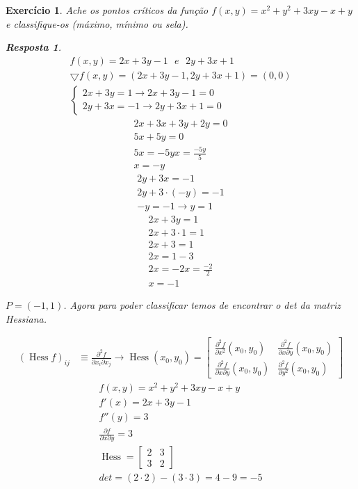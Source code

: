 \documentclass{article}
\newtheorem{ex}{Exercício}
\newtheorem{resp}{Resposta}
\DeclareMathOperator{\Hessian}{Hess}
\begin{document}
\begin{ex}
    Ache os pontos críticos da função $f(x,y) = x^2+y^2+3xy-x+y$ e classifique-os (máximo, mínimo ou sela).
\begin{resp}
\begin{align*}
    f(x,y)=2x+3y-1 \text{ } e \text{ } 2y+3x+1\\
    \bigtriangledown f(x,y)=(2x+3y-1,2y+3x+1)=(0,0)
    \\
    \begin{cases}
    2x+3y=1\to 2x+3y-1=0 \\2y+3x=-1\to 2y+3x+1=0
    \end{cases}
\end{align*}
\begin{align*} %
    2x+3x+3y+2y=0\\
    5x+5y=0\\
    5x=-5y
    x=\frac{-5y}{5}\\
    x=-y
\end{align*}
\begin{align*} %
    2y+3x=-1\\
    2y+3\cdot(-y)=-1\\
    -y=-1\to y=1
\end{align*}
\begin{align*} %
    2x+3y=1\\
    2x+3\cdot 1=1\\
    2x+3=1\\
    2x=1-3\\
    2x=-2
    x=\frac{-2}{2}\\
    x=-1
\end{align*}

$P=(-1,1)$. Agora para poder classificar temos de encontrar o det da matriz Hessiana.

\begin{align*}
  (\Hessian f)_{ij} &\equiv \frac{\partial^{2} f}{\partial x_{i} \partial x_{j} } \to
  \Hessian\left( x_0,y_0 \right) = 
  \begin{bmatrix}
    \frac{\partial^{2} f}{\partial x^2}(x_0,y_0) & \frac{\partial^{2} f}{\partial x\partial y}(x_0,y_0) \\
    \frac{\partial^{2} f}{\partial x\partial y}(x_0,y_0) & \frac{\partial^{2} f}{\partial y^2}(x_0,y_0)
  \end{bmatrix}
\end{align*}
\begin{align*}
    f(x,y)=x^2+y^2+3xy-x+y\\
    f'(x)=2x+3y-1\\
    f''(y)=3\\
    \frac{\partial f}{\partial x \partial y}=3\\
    \Hessian =\begin{bmatrix}
    2 & 3 \\
    3 & 2
    \end{bmatrix}\\
    det=(2\cdot 2)-(3\cdot 3) = 4-9 = -5
\end{align*}


\end{resp}
\end{ex}
\end{document}
